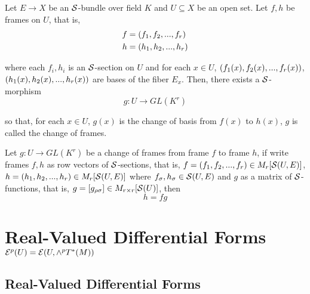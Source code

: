 \begin{proposition}
\end{proposition}

\begin{definition}
	Let $E \to X$ be an $\mathcal{S}$-bundle over field $K$ and $U \subseteq X$ be an open set. Let $f, h$ be frames on $U$, that is,
	\begin{align*}
		f &= (f_1, f_2, ..., f_r) \\
		h &= (h_1, h_2, ..., h_r) \\
	\end{align*}
	
	where each $f_i, h_i$ is an $\mathcal{S}$-section on $U$ and for each $x \in U$, $(f_1(x), f_2(x), ..., f_r(x))$, $(h_1(x), h_2(x), ..., h_r(x))$ are bases of the fiber $E_x$. Then, there exists a $\mathcal{S}$-morphism
	$$
	g: U \to GL(K^r)
	$$
	
	so that, for each $x \in U$, $g(x)$ is the change of basis from $f(x)$ to $h(x)$, $g$ is called the change of frames.
\end{definition}

\begin{remark}
	Let $g: U \to GL(K^r)$ be a change of frames from frame $f$ to frame $h$, if write frames $f, h$ as row vectors of $\mathcal{S}$-sections, that is, $f = (f_1, f_2, ..., f_r)  \in M_{r}[\mathcal{S}(U, E)]$, $h = (h_1, h_2, ..., h_r) \in M_{r}[\mathcal{S}(U, E)]$ where $f_\sigma, h_\sigma \in \mathcal{S}(U, E)$ and $g$ as a matrix of $\mathcal{S}$-functions, that is, $g = [g_{\rho \sigma}]  \in M_{r \times r}[\mathcal{S}(U)]$, then
	$$
		h = fg
	$$
\end{remark}

\section{Real-Valued Differential Forms\\ $\mathcal{E}^p(U) = \mathcal{E}(U, \wedge^p T^*(M))$}

\subsection{Real-Valued Differential Forms}

